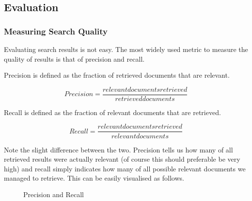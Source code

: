 \subsection{Evaluation}

\subsubsection{Measuring Search Quality}

Evaluating search results is not easy. The most widely used metric to measure the quality of results is that of precision and recall.

Precision is defined as the fraction of retrieved documents that are relevant.

\begin{equation}
  Precision = \frac{relevant documents retrieved}{retrieved documents}
  \label{eq:precision}
\end{equation}

Recall is defined as the fraction of relevant documents that are retrieved.

\begin{equation}
  Recall = \frac{relevant documents retrieved}{relevant documents}
  \label{eq:recall}
\end{equation}

Note the slight difference between the two. Precision tells us how many of all retrieved results were actually relevant (of course this should preferable be very high) and recall simply indicates how many of all possible relevant documents we managed to retrieve. This can be easily visualised as follows.

\def\leftcircle{(0,0) circle (1.5cm)}
\def\rightcircle{(0:2cm) circle (1.5cm)}

\begin{figure}[htb]
  \centering
\caption[Precision and Recall]{Precision and Recall}
\label{fig:PR}
\end{figure}

